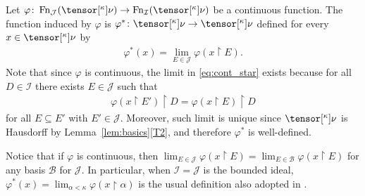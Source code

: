 \documentclass{amsart}
\numberwithin{equation}{section}
\newcommand{\B}{\mathcal{B}}
\newcommand{\I}{\mathcal{I}}
\newcommand{\J}{\mathcal{J}}
\newcommand{\pre}[2]{\tensor[^{#1}]{#2}{}}
\newcommand{\1}{\mathbf{I}}
\newcommand{\2}{\mathbf{II}}
\renewcommand{\a}{\alpha}
\renewcommand{\k}{\kappa}
\renewcommand{\phi}{\varphi}
\DeclareMathOperator{\Fn}{Fn}
\theoremstyle{definition}
\theoremstyle{remark}
\begin{document}
Let  $\varphi \colon \Fn_\J( \pre{\k}{\nu} ) \to \Fn_\I( \pre{\k}{\nu} ) $ be a continuous function. The function induced by $\varphi$ is \(\varphi^* \colon  \pre{\k}{\nu}  \to \pre{\k}{\nu}\) defined for every \(x \in \pre{\k}{\nu}\) by 
\begin{align}\label{eq:cont_star}
\phi^*(x)=\lim_{E \in \J}\phi(x\restriction E).
\end{align}
 Note that since \(\phi\) is continuous, the limit in \eqref{eq:cont_star} exists because for all \(D\in \I\) there exists \(E \in \J\) such that
 \begin{align*}
\phi(x\restriction E')\restriction D=\phi(x\restriction E)\restriction D 
\end{align*}
for all \(E \subseteq E'\) with \(E' \in \J\). Moreover, such limit is unique since \(\pre{\k}{\nu}\) is Hausdorff by Lemma~\ref{lem:basics}\ref{T2}, and therefore \(\phi^*\) is well-defined. 

Notice that if \(\phi\) is continuous, then \(\lim_{E \in \J}\phi(x\restriction E)=\lim_{E \in \B}\phi(x\restriction E)\) for any basis \(\B\) for \(\J\). In particular, when \(\I=\J\) is the bounded ideal, \(\phi^*(x)=\lim_{\a<\k}\phi(x\restriction \a)\) is the usual definition also adopted in \cite[Definition 3.6]{AMR}. 
\end{document}
